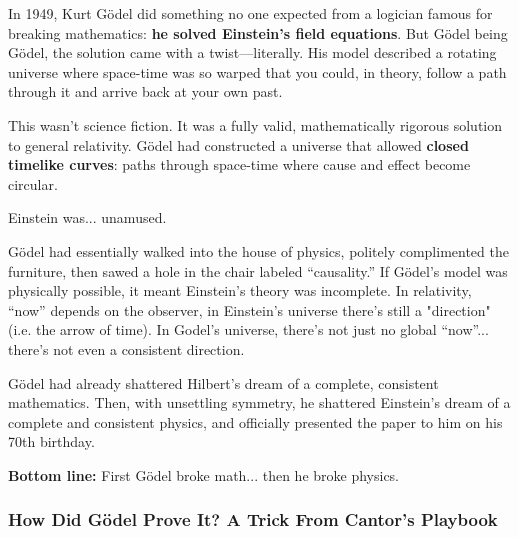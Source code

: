 \begin{tcolorbox}[colback=blue!5!white, colframe=blue!50!black,
  title={Historical Sidebar: Gödel’s Time-Twisting Universe}]
  
  In 1949, Kurt Gödel did something no one expected from a logician famous for breaking mathematics:  
  \textbf{he solved Einstein’s field equations}. But Gödel being Gödel, the solution came with a twist—literally. His model described a rotating universe where space-time was so warped that you could, in theory, follow a path through it and arrive back at your own past.
  
  \medskip
  
  This wasn’t science fiction. It was a fully valid, mathematically rigorous solution to general relativity. Gödel had constructed a universe that allowed \textbf{closed timelike curves}: paths through space-time where cause and effect become circular.
  
  \medskip
  
  Einstein was... unamused.

  \medskip
  
  Gödel had essentially walked into the house of physics, politely complimented the furniture, then sawed a hole in the chair labeled ``causality.'' If Gödel’s model was physically possible, it meant Einstein's theory was incomplete.  In relativity, ``now'' depends on the observer, in Einstein's universe there's still a "direction" (i.e. the arrow of time). In Godel's universe, there’s not just no global “now”... there’s not even a consistent direction.
  
  \medskip

  Gödel had already shattered Hilbert’s dream of a complete, consistent mathematics. Then, with unsettling symmetry, he shattered Einstein's dream of a complete and consistent physics, and officially presented the paper to him on his 70th birthday.

  \medskip

  \textbf{Bottom line:} First Gödel broke math... then he broke physics.

  
\end{tcolorbox}

\vspace{1em}

\subsubsection{How Did Gödel Prove It? A Trick From Cantor’s Playbook}

